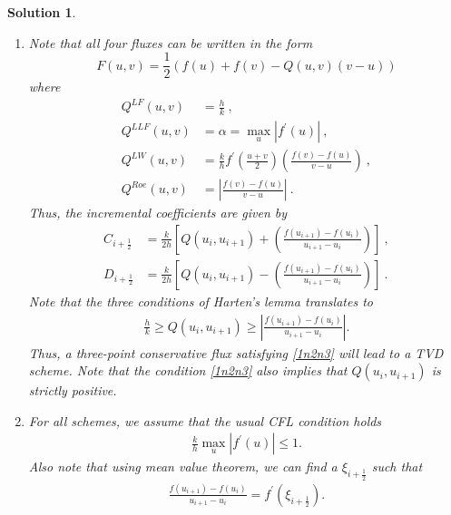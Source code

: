 \documentclass[10pt,letterpaper]{article}
\newcommand{\iph}{{i + \frac{1}{2}}}
\theoremstyle{break}
\newtheorem{solution}{Solution}
\begin{document}
\begin{solution}
        \begin{enumerate}
                \item
                Note that all four fluxes can be written in the form
                \[
                F(u,v) = \frac{1}{2} \left( f(u) + f(v) - Q(u,v) (v-u)\right)
                \]
                where
                \begin{align*}
                Q^{LF}(u,v) &= \frac{h}{k}\ ,\\
                Q^{LLF}(u,v) &= \alpha = \max_u |f^\prime(u)|\ ,\\
                Q^{LW}(u,v) &= \frac{k}{h} f^\prime\left( \frac{u+v}{2}\right)\left(\frac{f(v) - f(u)}{v-u}\right)\ ,\\
                Q^{Roe}(u,v) &= \left|\frac{f(v) - f(u)}{v-u}\right|\ .
                \end{align*}
                Thus, the incremental coefficients are given by
                \begin{align*}
                C_\iph &= \frac{k}{2h} \left [Q(u_i,u_{i+1})+\left(\frac{f(u_{i+1}) - f(u_i)}{u_{i+1} - u_i}\right) \right]\ ,\\
                D_\iph &= \frac{k}{2h} \left [Q(u_i,u_{i+1})-\left(\frac{f(u_{i+1}) - f(u_i)}{u_{i+1} - u_i}\right) \right] \ .
                \end{align*}
                Note that the three conditions of Harten's lemma translates to 
                \begin{align}
                \label{1n2n3}
                \frac{h}{k} \geq Q(u_i,u_{i+1}) \geq \left|\frac{f(u_{i+1}) - f(u_i)}{u_{i+1} - u_i}\right| .
                \end{align}
                Thus, a three-point conservative flux satisfying \eqref{1n2n3} will lead to a TVD scheme.
                Note that the condition \eqref{1n2n3} also implies that $Q(u_i,u_{i+1})$ is strictly positive.
                
                \item
                For all schemes, we assume that the usual CFL condition holds
                \begin{gather} \label{cfl}
                \frac{k}{h} \max_u |f^\prime(u)| \leq 1.
                \end{gather}
                Also note that using mean value theorem, we can find a $\xi_\iph$ such that
                \begin{gather} \label{mvt}
                \frac{f(u_{i+1}) - f(u_i)}{u_{i+1} - u_i} = f^\prime(\xi_\iph).
                \end{gather}
                \begin{itemize}
                

\end{itemize}
\end{enumerate}
\end{solution}
\end{document}
